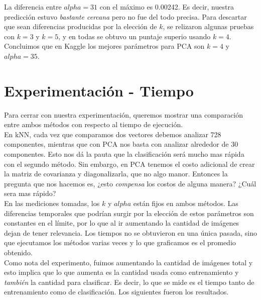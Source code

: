 La diferencia entre $alpha=31$ con el máximo es 0.00242. Es decir, nuestra predicción estuvo \textit{bastante cercana} pero no fue del todo precisa. Para descartar que sean diferencias producidas por la elección de $k$, se relizaron algunas pruebas con $k=3$ y $k=5$, y en todas se obtuvo un puntaje superio usando $k=4$. Concluimos que en Kaggle los mejores parámetros para PCA son $k=4$ y $alpha=35$.  \\

\newpage
\section{Experimentación - Tiempo}

Para cerrar con nuestra experimentación, queremos mostrar una comparación entre ambos métodos con respecto al tiempo de ejecución. \\

En kNN, cada vez que comparamos dos vectores debemos analizar 728 componentes, mientras que con PCA nos basta con analizar alrededor de 30 componentes. Esto nos dá la pauta que la clasificación será mucho mas rápida con el segundo método. Sin embargo, en PCA tenemos el costo adicional de crear la matriz de covarianza y diagonalizarla, que no algo manor. Entonces la pregunta que nos hacemos es, ¿esto \textit{compensa} los costos de alguna manera? ¿Cuál sera mas rápido? \\

En las mediciones tomadas, los $k$ y $alpha$ están fijos en ambos métodos. Las diferencias temporales que podrían surgir por la elección de estos parámetros son constantes en el límite, por lo que al ir aumentando la cantidad de imágenes dejan de tener relevancia. Los tiempos no se obtuvieron en una única pasada, sino que ejecutamos los métodos varias veces y lo que graficamos es el promedio obtenido. \\

Como nota del experimento, fuimos aumentando la cantidad de imágenes total y esto implica que lo que aumenta es la cantidad usada como entrenamiento y \textit{también} la cantidad para clasificar. Es decir, lo que se mide es el tiempo tanto de entrenamiento como de clasificación. Los siguientes fueron los resultados. \\


